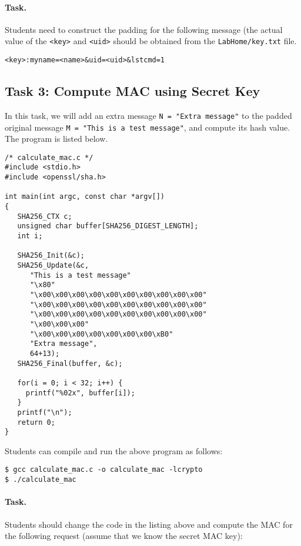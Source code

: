 \paragraph{Task.} Students need to construct the padding for the following
message (the actual value of the \texttt{<key>} and \texttt{<uid>} should
be obtained from the \texttt{LabHome/key.txt} file.

\begin{lstlisting}
<key>:myname=<name>&uid=<uid>&lstcmd=1
\end{lstlisting}



\subsection{Task 3: Compute MAC using Secret Key}

In this task, we will add an extra message \texttt{N = "Extra message"}
to the padded original message \texttt{M = "This is a test message"},
and compute its hash value. The program is listed below.

\begin{lstlisting}
/* calculate_mac.c */
#include <stdio.h>
#include <openssl/sha.h>

int main(int argc, const char *argv[])
{
   SHA256_CTX c;
   unsigned char buffer[SHA256_DIGEST_LENGTH];
   int i;

   SHA256_Init(&c);
   SHA256_Update(&c,
      "This is a test message"
      "\x80"
      "\x00\x00\x00\x00\x00\x00\x00\x00\x00\x00"
      "\x00\x00\x00\x00\x00\x00\x00\x00\x00\x00"
      "\x00\x00\x00\x00\x00\x00\x00\x00\x00\x00"
      "\x00\x00\x00"
      "\x00\x00\x00\x00\x00\x00\x00\xB0"
      "Extra message",
      64+13);
   SHA256_Final(buffer, &c);

   for(i = 0; i < 32; i++) {
     printf("%02x", buffer[i]);
   }
   printf("\n");
   return 0;
}
\end{lstlisting}

Students can compile and run the above program as follows:

\begin{lstlisting}
$ gcc calculate_mac.c -o calculate_mac -lcrypto
$ ./calculate_mac
\end{lstlisting}


\paragraph{Task.}
Students should change the code in the listing above and compute
the MAC for the following request (assume that we know
the secret MAC key):

